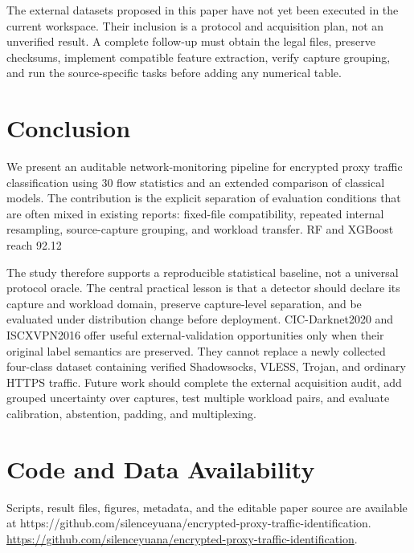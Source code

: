 \documentclass[conference]{IEEEtran}
\begin{document}
The external datasets proposed in this paper have not yet been executed in the current workspace. Their inclusion is a protocol and acquisition plan, not an unverified result. A complete follow-up must obtain the legal files, preserve checksums, implement compatible feature extraction, verify capture grouping, and run the source-specific tasks before adding any numerical table.

\section{Conclusion}
We present an auditable network-monitoring pipeline for encrypted proxy traffic classification using 30 flow statistics and an extended comparison of classical models. The contribution is the explicit separation of evaluation conditions that are often mixed in existing reports: fixed-file compatibility, repeated internal resampling, source-capture grouping, and workload transfer. RF and XGBoost reach 92.12%

The study therefore supports a reproducible statistical baseline, not a universal protocol oracle. The central practical lesson is that a detector should declare its capture and workload domain, preserve capture-level separation, and be evaluated under distribution change before deployment. CIC-Darknet2020 and ISCXVPN2016 offer useful external-validation opportunities only when their original label semantics are preserved. They cannot replace a newly collected four-class dataset containing verified Shadowsocks, VLESS, Trojan, and ordinary HTTPS traffic. Future work should complete the external acquisition audit, add grouped uncertainty over captures, test multiple workload pairs, and evaluate calibration, abstention, padding, and multiplexing.

\section{Code and Data Availability}
Scripts, result files, figures, metadata, and the editable paper source are available at https://github.com/silenceyuana/encrypted-proxy-traffic-identification.
\url{https://github.com/silenceyuana/encrypted-proxy-traffic-identification}.
\end{document}
